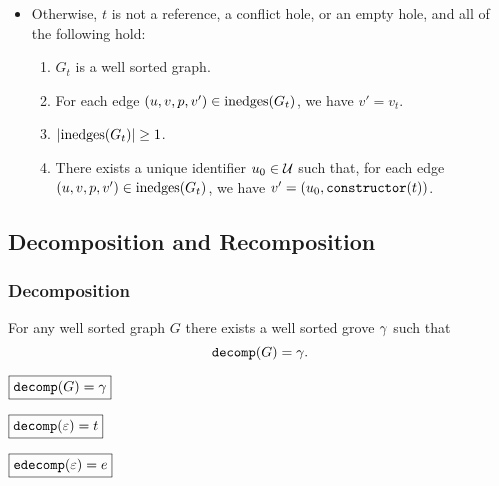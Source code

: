 \begin{definition}
\begin{itemize}
    \item Otherwise, $t$ is not a reference, a conflict hole, or an empty hole, and all of the following hold:
      \begin{enumerate}
        \item $G_t$ is a well sorted graph.
        \item For each edge $(u, v, p, v') \in \text{inedges}\mathopen{}\left(G_t\right)\mathclose{}$, we have $v' = v_t$.
        \item $\left\lvert\text{inedges}\mathopen{}\left(G_t\right)\mathclose{}\right\rvert \geq 1$.
        \item There exists a unique identifier $u_0 \in \mathcal{U}$ such that,
          for each edge $(u, v, p, v') \in \text{inedges}\mathopen{}\left(G_t\right)\mathclose{}$,
          we have $v' = (u_0, \operatorname{\texttt{constructor}}\mathopen{}\left(t\right)\mathclose{})$.
      \end{enumerate}
  \end{itemize}
\end{definition}


\subsection{Decomposition and Recomposition}


\subsubsection{Decomposition}

\begin{theorem}
  For any well sorted graph $G$
  there exists a well sorted grove $\gamma$
  such that \[\operatorname{\texttt{decomp}}\mathopen{}\left(G\right)\mathclose{} = \gamma.\]
\end{theorem}


\noindent $\boxed{\operatorname{\texttt{decomp}}\mathopen{}\left(G\right)\mathclose{} = \gamma}$
%
\figureDecompositionDefDecomp

\noindent $\boxed{\operatorname{\texttt{decomp}}\mathopen{}\left(\varepsilon\right)\mathclose{} = t}$
%
\figureDecompositionDefDecompTerm

\noindent $\boxed{\operatorname{\texttt{edecomp}}\mathopen{}\left(\varepsilon\right)\mathclose{} = e}$
%
\figureDecompositionDefEdecomp

